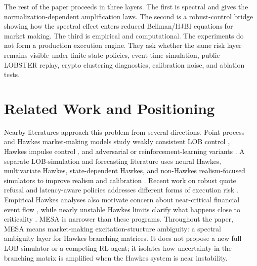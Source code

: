 \documentclass[11pt]{article}
\begin{document}
The rest of the paper proceeds in three layers. The first is spectral and gives the
normalization-dependent amplification laws. The second is a robust-control
bridge showing how the spectral effect enters reduced Bellman/HJBI equations
for market making. The third is empirical and computational. The experiments do
not form a production execution engine. They ask whether the same risk layer
remains visible under finite-state policies, event-time simulation, public
LOBSTER replay, crypto clustering diagnostics, calibration noise, and ablation
tests.

\medskip
\noindent{}

\section{Related Work and Positioning}

Nearby literatures approach this problem from several directions. Point-process
and Hawkes market-making models study weakly consistent LOB control
\cite{LawViens2019}, Hawkes impulse control \cite{Jain2025}, and adversarial or
reinforcement-learning variants \cite{WangHawkesARL2025}. A separate
LOB-simulation and forecasting literature uses neural Hawkes, multivariate
Hawkes, state-dependent Hawkes, and non-Hawkes realism-focused simulators to
improve realism and calibration
\cite{LalorSwishchuk2025,Kumar2024,Raffaelli2026,ElKarmiSimulator2025,Noble2026,Kimura2026}.
Recent work on robust quote refusal and latency-aware policies addresses
different forms of execution risk \cite{WangNoQuote2025,Jiang2025}. Empirical
Hawkes analyses also motivate concern about near-critical financial event flow
\cite{Hardiman2013}, while nearly unstable Hawkes limits clarify what happens
close to criticality \cite{SzymanskiXu2025,ElKarmi2026}. MESA is narrower than
these programs. Throughout the paper, MESA means market-making
excitation-structure ambiguity: a spectral ambiguity layer for Hawkes branching
matrices. It does not propose a new full LOB simulator or a competing RL agent;
it isolates how uncertainty in the branching matrix is amplified when the
Hawkes system is near instability.
\end{document}
